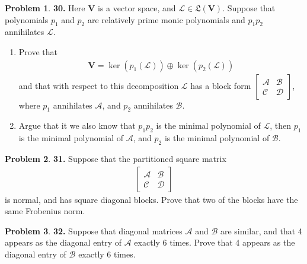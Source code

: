 \documentclass{book}
\theoremstyle{definition}
\newtheorem*{prob*}{Problem}
\newcommand{\V}{\mathbf{V}}
\newcommand{\A}{\mathcal{A}}
\newcommand{\B}{\mathcal{B}}
\newcommand{\lag}{\mathcal{L}}
\newcommand{\LL}{\mathfrak{L}}
\begin{document}
\begin{prob*}\textbf{30.} Here $\V$ is a vector space, and $\lag \in \LL(\V)$. Suppose that polynomials $p_1$ and $p_2$ are relatively prime monic polynomials and $p_1p_2$ annihilates $\lag$. 
	
	\begin{enumerate}
		\item Prove that
		\begin{align*}
		\V = \ker(p_1(\lag)) \oplus \ker(p_2(\lag))
		\end{align*}
		and that with respect to this decomposition $\lag$ has a block form $\begin{bmatrix}
		\A & \B \\ \mathcal{C} & \mathcal{D}
		\end{bmatrix}$, where $p_1$ annihilates $\A$, and $p_2$ annihilates $\B$.
		
		
		\item Argue that it we also know that $p_1p_2$ is the minimal polynomial of $\lag$, then $p_1$ is the minimal polynomial of $\A$, and $p_2$ is the minimal polynomial of $\B$.
	\end{enumerate} 
	
\end{prob*}


\newpage














\begin{prob*}\textbf{31.} Suppose that the partitioned square matrix
	\begin{align*}
	\begin{bmatrix}
	\A & \B \\ \mathcal{C} & \mathcal{D}
	\end{bmatrix}
	\end{align*} 
	is normal, and has square diagonal blocks. Prove that two of the blocks have the same Frobenius norm.
	
\end{prob*}




\newpage




\begin{prob*}\textbf{32.} Suppose that diagonal matrices $\A$ and $\B$ are similar, and that 4 appears as the diagonal entry of $\A$ exactly 6 times. Prove that 4 appears as the diagonal entry of $\B$ exactly 6 times. 
	
\end{prob*}
\end{document}
